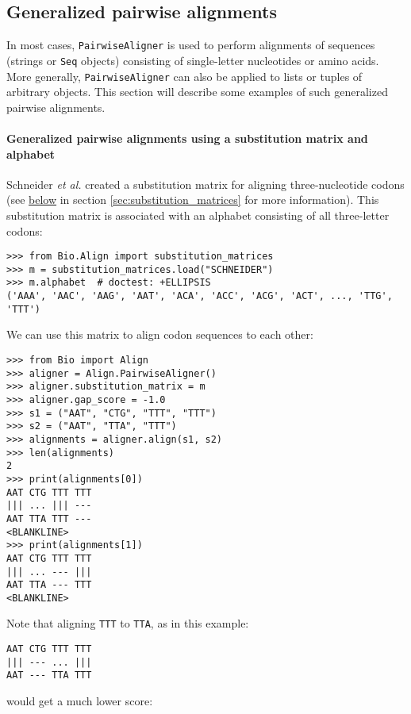 \subsection{Generalized pairwise alignments}
\label{sec:generalized-pairwise}

In most cases, \verb+PairwiseAligner+ is used to perform alignments of sequences (strings or \verb+Seq+ objects) consisting of single-letter nucleotides or amino acids. More generally, \verb+PairwiseAligner+ can also be applied to lists or tuples of arbitrary objects. This section will describe some examples of such generalized pairwise alignments.

\paragraph*{Generalized pairwise alignments using a substitution matrix and alphabet}

Schneider \textit{et al.} \cite{schneider2005} created a substitution matrix for aligning three-nucleotide codons (see \hyperlink{codonmatrix}{below} in section \ref{sec:substitution_matrices} for more information). This substitution matrix is associated with an alphabet consisting of all three-letter codons:

\begin{verbatim}
>>> from Bio.Align import substitution_matrices
>>> m = substitution_matrices.load("SCHNEIDER")
>>> m.alphabet  # doctest: +ELLIPSIS
('AAA', 'AAC', 'AAG', 'AAT', 'ACA', 'ACC', 'ACG', 'ACT', ..., 'TTG', 'TTT')
\end{verbatim}
We can use this matrix to align codon sequences to each other:

\begin{verbatim}
>>> from Bio import Align
>>> aligner = Align.PairwiseAligner()
>>> aligner.substitution_matrix = m
>>> aligner.gap_score = -1.0
>>> s1 = ("AAT", "CTG", "TTT", "TTT")
>>> s2 = ("AAT", "TTA", "TTT")
>>> alignments = aligner.align(s1, s2)
>>> len(alignments)
2
>>> print(alignments[0])
AAT CTG TTT TTT
||| ... ||| ---
AAT TTA TTT ---
<BLANKLINE>
>>> print(alignments[1])
AAT CTG TTT TTT
||| ... --- |||
AAT TTA --- TTT
<BLANKLINE>
\end{verbatim}
Note that aligning \verb+TTT+ to \verb+TTA+, as in this example:
\begin{verbatim}
AAT CTG TTT TTT
||| --- ... |||
AAT --- TTA TTT
\end{verbatim}
would get a much lower score:

